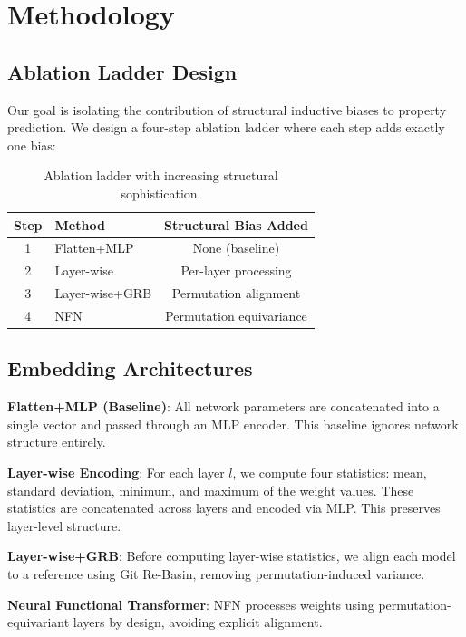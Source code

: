 \section{Methodology}
\label{sec:methodology}

\subsection{Ablation Ladder Design}

Our goal is isolating the contribution of structural inductive biases to property prediction. We design a four-step ablation ladder where each step adds exactly one bias:

\begin{table}[h]
\centering
\begin{tabular}{@{}clc@{}}
\toprule
Step & Method & Structural Bias Added \\
\midrule
1 & Flatten+MLP & None (baseline) \\
2 & Layer-wise & Per-layer processing \\
3 & Layer-wise+GRB & Permutation alignment \\
4 & NFN & Permutation equivariance \\
\bottomrule
\end{tabular}
\caption{Ablation ladder with increasing structural sophistication.}
\label{tab:ablation_ladder}
\end{table}

\subsection{Embedding Architectures}

\textbf{Flatten+MLP (Baseline)}: All network parameters are concatenated into a single vector and passed through an MLP encoder. This baseline ignores network structure entirely.

\textbf{Layer-wise Encoding}: For each layer $l$, we compute four statistics: mean, standard deviation, minimum, and maximum of the weight values. These statistics are concatenated across layers and encoded via MLP. This preserves layer-level structure.

\textbf{Layer-wise+GRB}: Before computing layer-wise statistics, we align each model to a reference using Git Re-Basin, removing permutation-induced variance.

\textbf{Neural Functional Transformer}: NFN processes weights using permutation-equivariant layers by design, avoiding explicit alignment.

